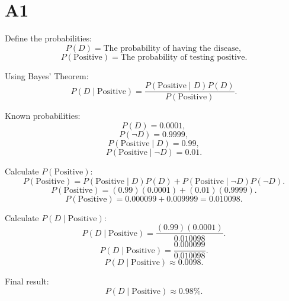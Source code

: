 \documentclass{article}
\begin{document}
\section*{A1}

\quad Define the probabilities:
\[
P(D) = \text{The probability of having the disease},
\]
\[
P(\text{Positive}) = \text{The probability of testing positive}.
\]

Using Bayes' Theorem:
\[
P(D \mid \text{Positive}) = \frac{P(\text{Positive} \mid D) P(D)}{P(\text{Positive})}.
\]

Known probabilities:
\[
P(D) = 0.0001,
\]
\[
P(\neg D) = 0.9999,
\]
\[
P(\text{Positive} \mid D) = 0.99,
\]
\[
P(\text{Positive} \mid \neg D) = 0.01.
\]

Calculate \( P(\text{Positive}) \):
\[
P(\text{Positive}) = P(\text{Positive} \mid D) P(D) + P(\text{Positive} \mid \neg D) P(\neg D).
\]
\[
P(\text{Positive}) = (0.99)(0.0001) + (0.01)(0.9999).
\]
\[
P(\text{Positive}) = 0.000099 + 0.009999 = 0.010098.
\]

Calculate \( P(D \mid \text{Positive}) \):
\[
P(D \mid \text{Positive}) = \frac{(0.99)(0.0001)}{0.010098}.
\]
\[
P(D \mid \text{Positive}) = \frac{0.000099}{0.010098}.
\]
\[
P(D \mid \text{Positive}) \approx 0.0098.
\]

Final result:
\[
P(D \mid \text{Positive}) \approx 0.98\%.
\]
\end{document}

